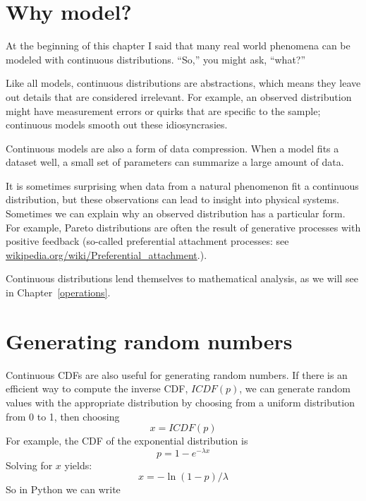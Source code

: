 \documentclass[12pt]{book}
\begin{document}
\section{Why model?}


At the beginning of this chapter I said that many real world phenomena
can be modeled with continuous distributions.  ``So,'' you might ask,
``what?''


Like all models, continuous distributions are abstractions, which
means they leave out details that are considered irrelevant.
For example, an observed distribution might have measurement errors
or quirks that are specific to the sample; continuous models smooth
out these idiosyncrasies.


Continuous models are also a form of data compression.  When a model
fits a dataset well, a small set of parameters can summarize a
large amount of data.



It is sometimes surprising when data from a natural phenomenon fit a
continuous distribution, but these observations can lead to insight
into physical systems.  Sometimes we can explain why an observed
distribution has a particular form.  For example, Pareto distributions
are often the result of generative processes with positive feedback
(so-called preferential attachment processes: see
\url{wikipedia.org/wiki/Preferential_attachment}.).




Continuous distributions lend themselves to mathematical analysis, as
we will see in Chapter~\ref{operations}.


\section{Generating random numbers}


Continuous CDFs are also useful for generating random numbers.
If there is an efficient way to compute the inverse CDF, $ICDF(p)$,
we can generate random values with the appropriate distribution
by choosing from a uniform distribution from 0 to 1, then choosing
%
\[ x = ICDF(p) \]
%
For example, the CDF of the exponential distribution is
%
\[ p = 1 - e^{-\lambda x} \]
%
Solving for $x$ yields:
%
\[ x = -\ln (1-p) / \lambda \]
%
So in Python we can write
\end{document}
